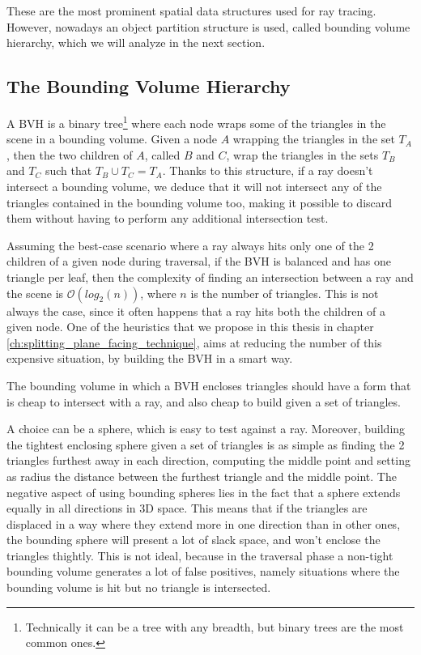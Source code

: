 \documentclass{PoliMi_MasterThesis}
\begin{document}
These are the most prominent spatial data structures used for ray tracing. However, nowadays an object partition structure is used, called bounding volume hierarchy, which we will analyze in the next section.

\subsection{The Bounding Volume Hierarchy} \label{ssec:the_bounding_volume_hierarchy}
A BVH \cite{bvh_primer} is a binary tree\footnote{Technically it can be a tree with any breadth, but binary trees are the most common ones.} where each node wraps some of the triangles in the scene in a bounding volume. Given a node $A$ wrapping the triangles in the set $T_A$, then the two children of $A$, called $B$ and $C$, wrap the triangles in the sets $T_B$ and $T_C$ such that $T_B \cup T_C = T_A$. Thanks to this structure, if a ray doesn't intersect a bounding volume, we deduce that it will not intersect any of the triangles contained in the bounding volume too, making it possible to discard them without having to perform any additional intersection test.

Assuming the best-case scenario where a ray always hits only one of the 2 children of a given node during traversal, if the BVH is balanced and has one triangle per leaf, then the complexity of finding an intersection between a ray and the scene is $\mathcal{O}(log_2(n))$, where $n$ is the number of triangles. This is not always the case, since it often happens that a ray hits both the children of a given node. One of the heuristics that we propose in this thesis in chapter \ref{ch:splitting_plane_facing_technique}, aims at reducing the number of this expensive situation, by building the BVH in a smart way.

The bounding volume in which a BVH encloses triangles should have a form that is cheap to intersect with a ray, and also cheap to build given a set of triangles.

A choice can be a sphere, which is easy to test against a ray. Moreover, building the tightest enclosing sphere given a set of triangles is as simple as finding the 2 triangles furthest away in each direction, computing the middle point and setting as radius the distance between the furthest triangle and the middle point. The negative aspect of using bounding spheres lies in the fact that a sphere extends equally in all directions in 3D space. This means that if the triangles are displaced in a way where they extend more in one direction than in other ones, the bounding sphere will present a lot of slack space, and won't enclose the triangles thightly. This is not ideal, because in the traversal phase a non-tight bounding volume generates a lot of false positives, namely situations where the bounding volume is hit but no triangle is intersected.
\end{document}
